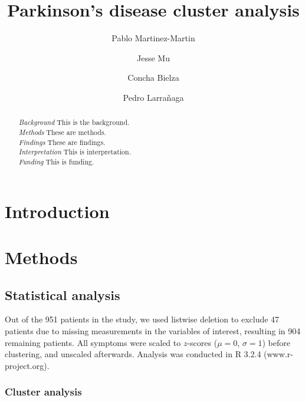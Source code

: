 \documentclass[preprint,3p,twocolumn]{elsarticle} %
\begin{document}
\begin{frontmatter}
\title{Parkinson's disease cluster analysis}
\author[c3]{Pablo Martinez-Martin}
\author[bc]{Jesse Mu}
\author[cig]{Concha Bielza}
\author[cig]{Pedro Larra\~naga}
\address[c3]{Area of Applied Epidemiology, National Centre of Epidemiology and CIBERNED, Carlos III Institute of Health, Madrid, Spain}
\address[bc]{Department of Computer Science, Boston College, Chestnut Hill, Massachusetts, USA}
\address[cig]{Computational Intelligence Group, Polytechnic University of Madrid, Madrid, Spain}

\begin{abstract}
\emph{Background} \quad This is the background. \\
\emph{Methods} \quad  These are methods. \\
\emph{Findings} \quad These are findings. \\
\emph{Interpretation} \quad This is interpretation. \\
\emph{Funding} \quad This is funding.
\end{abstract}
\end{frontmatter}


\section{Introduction}

\section{Methods}

\subsection{Statistical analysis}

Out of the 951 patients in the study, we used listwise deletion to exclude 47 patients due to
missing measurements in the variables of interest, resulting in 904 remaining patients. All
symptoms were scaled to $z$-scores ($\mu = 0$, $\sigma = 1$) before clustering, and unscaled
afterwards. Analysis was conducted in R 3.2.4 (www.r-project.org).

\subsubsection{Cluster analysis}
\end{document}
